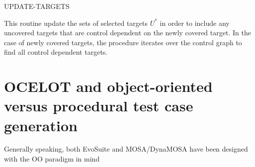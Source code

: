 \begin{algorithm}[H]
    \caption{UPDATE-TARGETS}


    \DontPrintSemicolon   

    
     {
    }
\end{algorithm}

This routine update the sets of selected targets $ U^* $ in order to include any uncovered targets that are control dependent on the newly covered target.
In the case of newly covered targets, the procedure iterates over the control graph to find all control dependent targets.









\newpage
\section{OCELOT and object-oriented versus procedural test case generation}
Generally speaking, both EvoSuite and MOSA/DynaMOSA have been designed with the OO paradigm in mind

